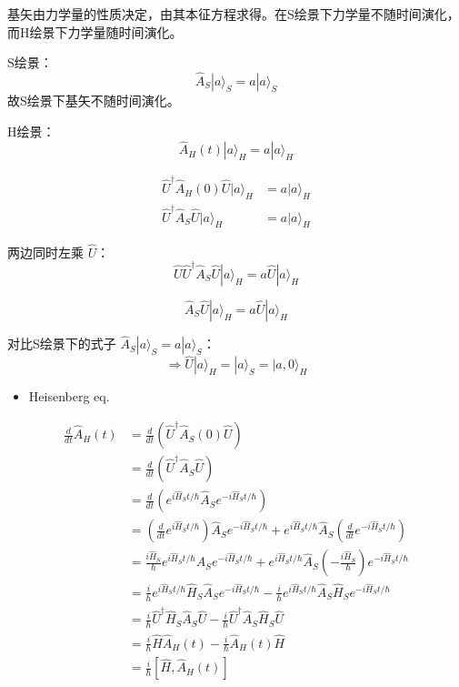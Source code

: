 \documentclass[lang=cn,10pt]{elegantbook}
\begin{document}
基矢由力学量的性质决定，由其本征方程求得。在S绘景下力学量不随时间演化，而H绘景下力学量随时间演化。

S绘景：
\[ \hat{A}_S |a\rangle_S = a |a\rangle_S \]
故S绘景下基矢不随时间演化。

H绘景：
\[ \hat{A}_H(t) |a\rangle_H = a |a\rangle_H \]

\begin{align*}
	\hat{U}^\dagger \hat{A}_H(0) \hat{U} |a\rangle_H &= a |a\rangle_H \\
	\hat{U}^\dagger \hat{A}_S \hat{U} |a\rangle_H &= a |a\rangle_H
\end{align*}

两边同时左乘 \(\hat{U}\)：
\[ \hat{U} \hat{U}^\dagger \hat{A}_S \hat{U} |a\rangle_H = a \hat{U} |a\rangle_H \]

\[ \hat{A}_S \hat{U} |a\rangle_H = a \hat{U} |a\rangle_H \]

对比S绘景下的式子 \(\hat{A}_S |a\rangle_S = a |a\rangle_S\)：
\[ \Rightarrow \hat{U} |a\rangle_H = |a\rangle_S = |a, 0\rangle_H \]

\begin{itemize}
	\item Heisenberg eq.
\end{itemize}

\begin{align*}
		\frac{d}{dt} \hat{A}_H(t) &= \frac{d}{dt} \left( \hat{U}^\dagger \hat{A}_S(0) \hat{U} \right) \\
		&= \frac{d}{dt} \left( \hat{U}^\dagger \hat{A}_S \hat{U} \right) \\
		&= \frac{d}{dt} \left( e^{i \hat{H}_S t / \hbar} \hat{A}_S e^{-i \hat{H}_S t / \hbar} \right) \\
	&= \left( \frac{d}{dt} e^{i \hat{H}_S t / \hbar} \right) \hat{A}_S e^{-i \hat{H}_S t / \hbar} + e^{i \hat{H}_S t / \hbar} \hat{A}_S \left( \frac{d}{dt} e^{-i \hat{H}_S t / \hbar} \right) \\
	&= \frac{i \hat{H}_S}{\hbar} e^{i \hat{H}_S t / \hbar} \hat{A}_S e^{-i \hat{H}_S t / \hbar} + e^{i \hat{H}_S t / \hbar} \hat{A}_S \left( -\frac{i \hat{H}_S}{\hbar} \right) e^{-i \hat{H}_S t / \hbar} \\
		&= \frac{i}{\hbar} e^{i \hat{H}_S t / \hbar} \hat{H}_S \hat{A}_S e^{-i \hat{H}_S t / \hbar} - \frac{i}{\hbar} e^{i \hat{H}_S t / \hbar} \hat{A}_S \hat{H}_S e^{-i \hat{H}_S t / \hbar} \\
		&= \frac{i}{\hbar} \hat{U}^\dagger \hat{H}_S \hat{A}_S \hat{U} - \frac{i}{\hbar} \hat{U}^\dagger \hat{A}_S \hat{H}_S \hat{U} \\
		&= \frac{i}{\hbar} \hat{H} \hat{A}_H(t) - \frac{i}{\hbar} \hat{A}_H(t) \hat{H} \\
		&= \frac{i}{\hbar} [\hat{H},\hat{A}_H(t)]
\end{align*}
\end{document}
